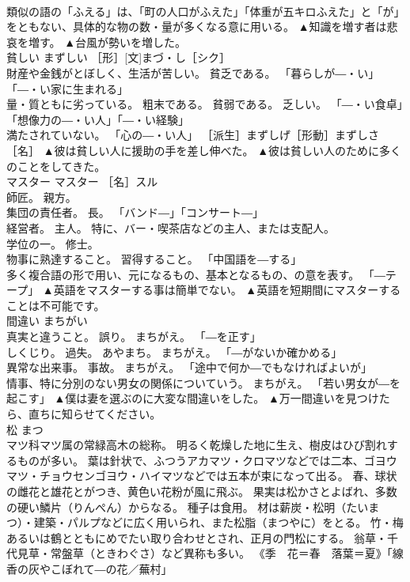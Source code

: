 \documentclass[8pt]{extreport}
\begin{document}
\begin{CJK}{UTF8}{min}
\\	類似の語の「ふえる」は、「町の人口がふえた」「体重が五キロふえた」と「が」をともない、具体的な物の数・量が多くなる意に用いる。	▲知識を増す者は悲哀を増す。 ▲台風が勢いを増した。
\\	貧しい	まずしい	［形］[文]まづ・し［シク］ 
\\	財産や金銭がとぼしく、生活が苦しい。 貧乏である。 「暮らしが―・い」「―・い家に生まれる」 
\\	量・質ともに劣っている。 粗末である。 貧弱である。 乏しい。 「―・い食卓」「想像力の―・い人」「―・い経験」 
\\	満たされていない。 「心の―・い人」 ［派生］まずしげ［形動］まずしさ［名］	▲彼は貧しい人に援助の手を差し伸べた。 ▲彼は貧しい人のために多くのことをしてきた。
\\	マスター	マスター	［名］スル 
\\	師匠。 親方。 
\\	集団の責任者。 長。 「バンド―」「コンサート―」 
\\	経営者。 主人。 特に、バー・喫茶店などの主人、または支配人。 
\\	学位の一。 修士。 
\\	物事に熟達すること。 習得すること。 「中国語を―する」 
\\	多く複合語の形で用い、元になるもの、基本となるもの、の意を表す。 「―テープ」	▲英語をマスターする事は簡単でない。 ▲英語を短期間にマスターすることは不可能です。
\\	間違い	まちがい	
\\	真実と違うこと。 誤り。 まちがえ。 「―を正す」 
\\	しくじり。 過失。 あやまち。 まちがえ。 「―がないか確かめる」 
\\	異常な出来事。 事故。 まちがえ。 「途中で何か―でもなければよいが」 
\\	情事、特に分別のない男女の関係についていう。 まちがえ。 「若い男女が―を起こす」	▲僕は妻を選ぶのに大変な間違いをした。 ▲万一間違いを見つけたら、直ちに知らせてください。
\\	松	まつ	
\\	マツ科マツ属の常緑高木の総称。 明るく乾燥した地に生え、樹皮はひび割れするものが多い。 葉は針状で、ふつうアカマツ・クロマツなどでは二本、ゴヨウマツ・チョウセンゴヨウ・ハイマツなどでは五本が束になって出る。 春、球状の雌花と雄花とがつき、黄色い花粉が風に飛ぶ。 果実は松かさとよばれ、多数の硬い鱗片（りんぺん）からなる。 種子は食用。 材は薪炭・松明（たいまつ）・建築・パルプなどに広く用いられ、また松脂（まつやに）をとる。 竹・梅あるいは鶴とともにめでたい取り合わせとされ、正月の門松にする。 翁草・千代見草・常盤草（ときわぐさ）など異称も多い。 《季　花＝春　落葉＝夏》「線香の灰やこぼれて―の花／蕪村」 

\end{CJK}
\end{document}
